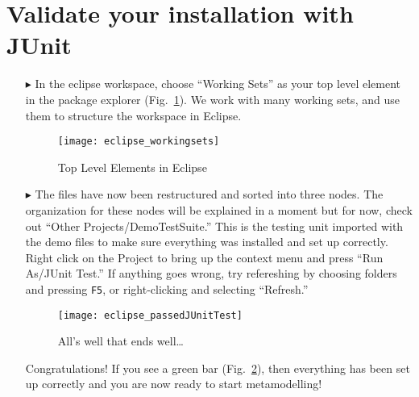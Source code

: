 \newpage
\genHeader
{}

\section{Validate your installation with JUnit}

\begin{itemize}

\item[$\blacktriangleright$] In\hypertarget{validate common}{} the eclipse workspace, choose ``Working Sets'' as your top level element in the package explorer (Fig.~\ref{fig_topLevel}). We work with many working sets, and use them to structure the workspace in Eclipse.

\begin{figure}[htbp]
	\centering
  \texttt{[image: eclipse\_workingsets]}
	\caption{Top Level Elements in Eclipse}
	\label{fig_topLevel}
\end{figure}

\item[$\blacktriangleright$] The files have now been restructured and sorted into three nodes. The organization for these nodes will be explained in a moment but for now, check out ``Other Projects/DemoTestSuite.'' This is the testing unit imported with the demo files to make sure everything was installed and set up correctly. Right click on the Project to bring up the context menu and press ``Run As/JUnit Test.'' If anything goes wrong, try refereshing by choosing folders and pressing  \texttt{F5}, or right-clicking and selecting ``Refresh.''

\vspace{0.5cm}

\begin{figure}[htbp]
	\centering
  \texttt{[image: eclipse\_passedJUnitTest]}
	\caption{All's well that ends well\ldots}
	\label{fig_passedTest}
\end{figure}

\vspace{0.5cm}

Congratulations!  If you see a green bar  (Fig.~\ref{fig_passedTest}), then everything has been set up correctly and you are now ready to start metamodelling!

\end{itemize}